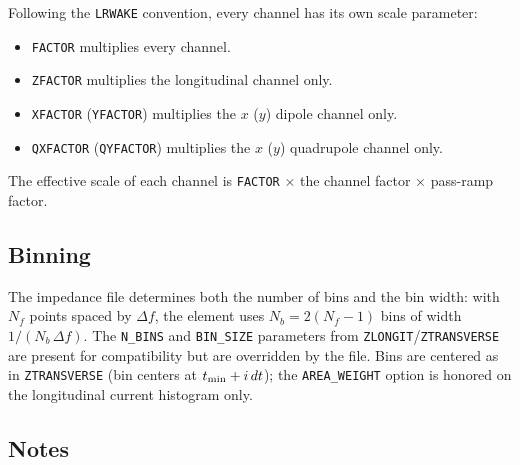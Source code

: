 Following the {\tt LRWAKE} convention, every channel has its own
scale parameter:
\begin{itemize}
\item {\tt FACTOR} multiplies every channel.
\item {\tt ZFACTOR} multiplies the longitudinal channel only.
\item {\tt XFACTOR} ({\tt YFACTOR}) multiplies the $x$ ($y$) dipole
  channel only.
\item {\tt QXFACTOR} ({\tt QYFACTOR}) multiplies the $x$ ($y$)
  quadrupole channel only.
\end{itemize}
The effective scale of each channel is {\tt FACTOR} $\times$ the
channel factor $\times$ pass-ramp factor.

\subsection*{Binning}

The impedance file determines both the number of bins and the bin
width: with $N_f$ points spaced by $\Delta f$, the element uses $N_b =
2(N_f-1)$ bins of width $1/(N_b\,\Delta f)$.  The {\tt N\_BINS} and
{\tt BIN\_SIZE} parameters from {\tt ZLONGIT}/{\tt ZTRANSVERSE} are
present for compatibility but are overridden by the file.  Bins are
centered as in {\tt ZTRANSVERSE} (bin centers at
$t_{\rm min}+i\,dt$); the {\tt AREA\_WEIGHT} option is honored on the
longitudinal current histogram only.

\subsection*{Notes}

